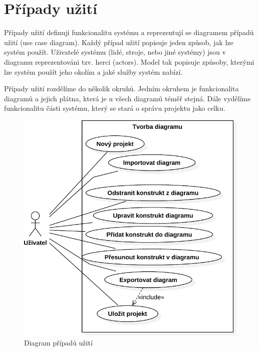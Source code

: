 \section{Případy užití}

Případy užití definují funkcionalitu systému a reprezentují se diagramem případů užití (use case diagram).
Každý případ užití popisuje jeden způsob, jak lze systém použít.
Uživatelé systému (lidé, stroje, nebo jiné systémy) jsou v diagramu reprezentováni tzv. herci (actors).
Model tak popisuje způsoby, kterými lze systém použít jeho okolím a jaké služby systém nabízí.~\cite[s.~65]{overgaard_usecases_2005}

Případy užití rozdělíme do několik okruhů.
Jedním okruhem je funkcionalita diagramů a jejich plátna, která je u všech diagramů téměř stejná.
Dále vydělíme funkcionalitu části systému, který se stará o správu projektu jako celku.

\begin{figure}[!htb]
  \centering
  \includegraphics[width=\maxwidth{0.7\textwidth}]{../img/diagrams/use-case-diagram.pdf}
  \caption{Diagram případů užití}
  \label{fig:use-case-diagram}
\end{figure}

